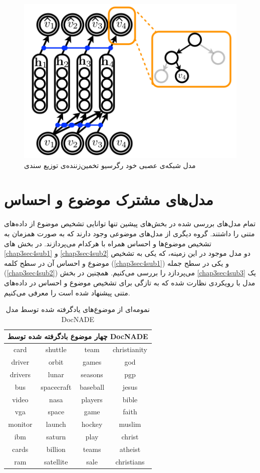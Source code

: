   \begin{figure}[!t]
  	\centering
  	\includegraphics[scale=0.4]{chap3-img/DocNADE}
  	\caption{مدل شبکه‌‌ی عصبی خود رگرسیو تخمین‌زننده‌ی توزیع سندی \cite{larochelle2012neural}}
  	\label{chap3-fig7}
  \end{figure}

\section{مدل‌های مشترک موضوع و احساس}
تمام مدل‌های بررسی‌ شده در بخش‌های پیشین تنها توانایی تشخیص موضوع از داده‌های متنی را داشتند. گروه دیگری از مدل‌های موضوعی وجود دارند که به صورت همزمان به تشخیص موضوع‌ها و احساس همراه با هرکدام می‌‌پردازند. در بخش های
\ref{chap3sec4sub1}
و
\ref{chap3sec4sub2}
دو مدل موجود در این زمینه، که یکی‌ به تشخیص موضوع و احساس آن در سطح کلمه
(\ref{chap3sec4sub1})
 و یکی‌ در سطح جمله
(\ref{chap3sec4sub2})
  می‌‌پردازد را بررسی‌ می‌‌کنیم. همچنین در بخش
\ref{chap3sec4sub3}
  یک مدل با رویکردی نظارت شده که به تازگی برای تشخیص موضوع و احساس در داده‌های متنی پیشنهاد شده است را معرفی‌ می‌‌کنیم.
  \begin{table}[!b]
	\centering
	\begin{tabular}{|c|c|c|c|}
		\hline
		\multicolumn{4}{|c|}{چهار موضوع بادگرفته شده توسط DocNADE}\\
		\hline
		card 	 & shuttle 		& team 	   & christianity\\
		driver 	 & orbit 		& games    & god\\
		drivers  & lunar 		& seasons  & pgp\\ 
		bus		 & spacecraft 	& baseball & jesus\\ 
		video	 & nasa  		& players  & bible\\ 
		vga		 & space 		& game     & faith\\ 
		monitor  & launch 		& hockey   & muslim\\ 
		ibm   	 & saturn  		& play 	   & christ\\ 
		cards	 & billion		& teams    & atheist\\
		ram    	 & satellite	& sale     & christians\\
		\hline
	\end{tabular}
	\caption{نمومه‌ای از موضوع‌های یادگرفته شده توسط مدل DocNADE \cite{larochelle2012neural}}
	\label{chap3-tb1}
\end{table}

